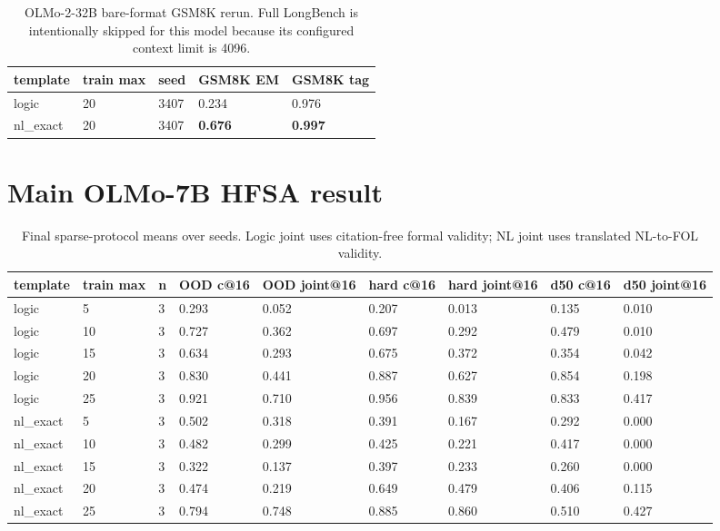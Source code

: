 \documentclass[10pt]{article}
\begin{document}
\begin{table}[H]
\centering
\small
\begin{tabular}{lllll}
\toprule
template & train max & seed & GSM8K EM & GSM8K tag \\
\midrule
logic & 20 & 3407 & 0.234 & 0.976 \\
nl\_exact & 20 & 3407 & \textbf{0.676} & \textbf{0.997} \\
\bottomrule
\end{tabular}
\caption{OLMo-2-32B bare-format GSM8K rerun. Full LongBench is intentionally skipped for this model because its configured context limit is 4096.}
\end{table}

\section{Main OLMo-7B HFSA result}
\begin{table}[H]
\centering
\small
\begin{tabular}{lllllllll}
\toprule
template & train max & n & OOD c@16 & OOD joint@16 & hard c@16 & hard joint@16 & d50 c@16 & d50 joint@16 \\
\midrule
logic & 5 & 3 & 0.293 & 0.052 & 0.207 & 0.013 & 0.135 & 0.010 \\
logic & 10 & 3 & 0.727 & 0.362 & 0.697 & 0.292 & 0.479 & 0.010 \\
logic & 15 & 3 & 0.634 & 0.293 & 0.675 & 0.372 & 0.354 & 0.042 \\
logic & 20 & 3 & 0.830 & 0.441 & 0.887 & 0.627 & 0.854 & 0.198 \\
logic & 25 & 3 & 0.921 & 0.710 & 0.956 & 0.839 & 0.833 & 0.417 \\
nl\_exact & 5 & 3 & 0.502 & 0.318 & 0.391 & 0.167 & 0.292 & 0.000 \\
nl\_exact & 10 & 3 & 0.482 & 0.299 & 0.425 & 0.221 & 0.417 & 0.000 \\
nl\_exact & 15 & 3 & 0.322 & 0.137 & 0.397 & 0.233 & 0.260 & 0.000 \\
nl\_exact & 20 & 3 & 0.474 & 0.219 & 0.649 & 0.479 & 0.406 & 0.115 \\
nl\_exact & 25 & 3 & 0.794 & 0.748 & 0.885 & 0.860 & 0.510 & 0.427 \\
\bottomrule
\end{tabular}
\caption{Final sparse-protocol means over seeds. Logic joint uses citation-free formal validity; NL joint uses translated NL-to-FOL validity.}
\end{table}
\end{document}
